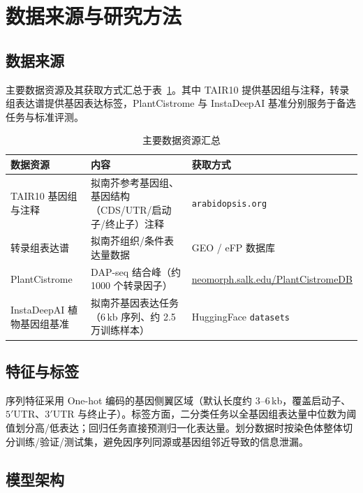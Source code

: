 \documentclass[UTF8,11pt,a4paper]{ctexart}
\begin{document}
\section{数据来源与研究方法}
\label{sec:method}

\subsection{数据来源}
\label{sec:method-data}

主要数据资源及其获取方式汇总于表~\ref{tab:data}。其中 TAIR10 提供基因组与注释，转录组表达谱提供基因表达标签，PlantCistrome 与 InstaDeepAI 基准分别服务于备选任务与标准评测。

\begin{table}[htbp]
\centering
\caption{主要数据资源汇总}
\label{tab:data}
\small
\begin{tabular}{@{}p{3.6cm}p{6.2cm}p{5.0cm}@{}}
\toprule
\textbf{数据资源} & \textbf{内容} & \textbf{获取方式} \\
\midrule
TAIR10 基因组与注释 & 拟南芥参考基因组、基因结构（CDS/UTR/启动子/终止子）注释 & \texttt{arabidopsis.org} \\
转录组表达谱 & 拟南芥组织/条件表达量数据 & GEO / eFP 数据库 \\
PlantCistrome & DAP-seq 结合峰（约 1000 个转录因子） & \url{neomorph.salk.edu/PlantCistromeDB} \\
InstaDeepAI 植物基因组基准 & 拟南芥基因表达任务（6\,kb 序列、约 2.5 万训练样本） & HuggingFace \texttt{datasets} \\
\bottomrule
\end{tabular}
\end{table}

\subsection{特征与标签}
\label{sec:method-feat}

序列特征采用 One-hot 编码的基因侧翼区域（默认长度约 3--6\,kb，覆盖启动子、$5'$UTR、$3'$UTR 与终止子）。标签方面，二分类任务以全基因组表达量中位数为阈值划分高/低表达；回归任务直接预测归一化表达量。划分数据时按染色体整体切分训练/验证/测试集，避免因序列同源或基因组邻近导致的信息泄漏。

\subsection{模型架构}
\label{sec:method-model}
\end{document}
